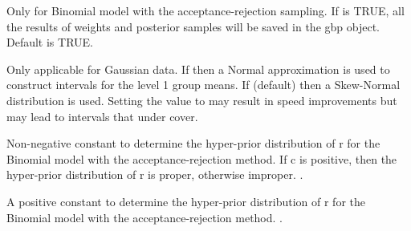 \documentclass[a4paper]{book}
\begin{document}
\begin{Arguments}
\begin{ldescription}
\item[\code{save.result}] 
Only for Binomial model with the acceptance-rejection sampling. If  is TRUE, all the results of weights and posterior samples will be saved in the gbp object. Default is TRUE.


\item[\code{normal.CI}] 
Only applicable for Gaussian data. If  then a Normal
approximation is used to construct intervals for the level 1 group
means. If  (default) then a Skew-Normal distribution is
used. Setting the value to  may result in speed
improvements but may lead to intervals that under cover. 


\item[\code{c}] 
Non-negative constant to determine the hyper-prior distribution of r for the Binomial model with the acceptance-rejection method. If c is positive, then the hyper-prior distribution of r is proper, otherwise improper. .


\item[\code{u}] 
A positive constant to determine the hyper-prior distribution of r for the Binomial model with the acceptance-rejection method. .


\end{ldescription}
\end{Arguments}
%
\end{document}

